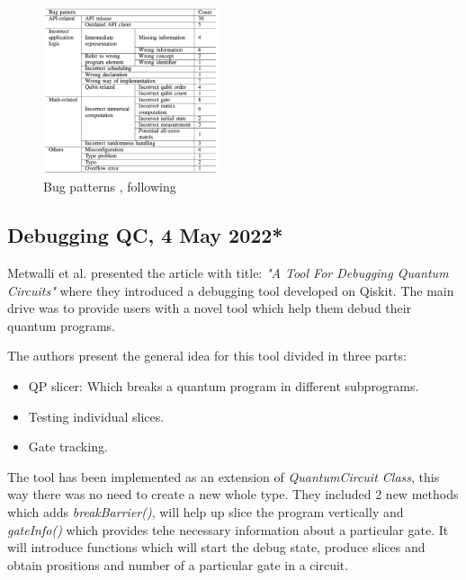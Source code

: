\begin{itemize}
\begin{figure}[H]
        \centering
        \includegraphics[width=0.46\textwidth]{TFM/photos/LuoBugPatterns.png}
        \caption{Bug patterns \cite{luo2022comprehensive}, following \cite{paltenghi2022bugs}} 
        \label{Fig:bugPatterns}
\end{figure}

\vspace{15pt}
\subsection{Debugging QC, 4 May 2022*}
Metwalli et al. presented the article with title: \textit{"A Tool For Debugging Quantum Circuits"} \cite{metwalli2022tool} where they introduced a debugging tool developed on Qiskit. The main drive was to provide users with a novel tool which help them debud their quantum programs.\newline

The authors present the general idea for this tool divided in three parts:
\begin{itemize}
    \item QP slicer: Which breaks a quantum program in different subprograms.
    \item Testing individual slices.
    \item Gate tracking.
\end{itemize}

The tool has been implemented as an extension of \textit{QuantumCircuit Class}, this way there was no need to create a new whole type. They included 2 new methods which adds \textit{breakBarrier()}, will help up slice the program vertically and \textit{gateInfo()} which provides tehe necessary information about a particular gate. It will introduce functions which will start the debug state, produce slices and obtain prositions and number of a particular gate in a circuit.\newline


\end{itemize}
